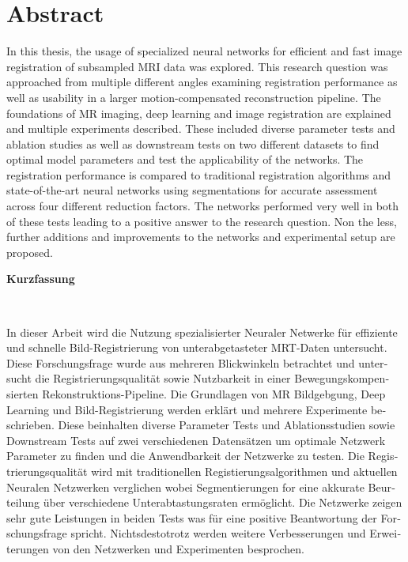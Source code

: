\chapter*{Abstract}
In this thesis, the usage of specialized neural networks for efficient and fast image registration of subsampled MRI data was explored. This research question was approached from multiple different angles examining registration performance as well as usability in a larger motion-compensated reconstruction pipeline. The foundations of MR imaging, deep learning and image registration are explained and multiple experiments described. These included diverse parameter tests and ablation studies as well as downstream tests on two different datasets to find optimal model parameters and test the applicability of the networks. The registration performance is compared to traditional registration algorithms and state-of-the-art neural networks using segmentations for accurate assessment across four different reduction factors. The networks performed very well in both of these tests leading to a positive answer to the research question. Non the less, further additions and improvements to the networks and experimental setup are proposed.

\vspace*{1.5cm}
\begin{Huge}
\noindent \textbf{Kurzfassung}
\end{Huge}
\chapterheadstartvskip \\
\begin{otherlanguage}{ngerman}
In dieser Arbeit wird die Nutzung spezialisierter Neuraler Netwerke für effiziente und schnelle Bild-Registrierung von unterabgetasteter MRT-Daten untersucht. Diese Forschungsfrage wurde aus mehreren Blickwinkeln betrachtet und untersucht die Registrierungsqualität sowie Nutzbarkeit in einer Bewegungskompensierten Rekonstruktions-Pipeline. Die Grundlagen von MR Bildgebgung, Deep Learning und Bild-Registrierung werden erklärt und mehrere Experimente beschrieben. Diese beinhalten diverse Parameter Tests und Ablationsstudien sowie Downstream Tests auf zwei verschiedenen Datensätzen um optimale Netzwerk Parameter zu finden und die Anwendbarkeit der Netzwerke zu testen. Die Registrierungsqualität wird mit traditionellen Registierungsalgorithmen und aktuellen Neuralen Netzwerken verglichen  wobei Segmentierungen for eine akkurate Beurteilung über verschiedene Unterabtastungsraten ermöglicht. Die Netzwerke zeigen sehr gute Leistungen in beiden Tests was für eine positive Beantwortung der Forschungsfrage spricht. Nichtsdestotrotz werden weitere Verbesserungen und Erweiterungen von den Netzwerken und Experimenten besprochen.
\end{otherlanguage}